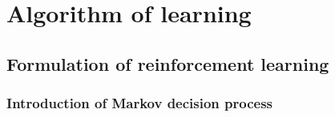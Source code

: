 \pagebreak
\chapter{Algorithm of learning}
\label{chapter:Algorithm}

\section{Formulation of reinforcement learning}


\subsection{Introduction of Markov decision process}


